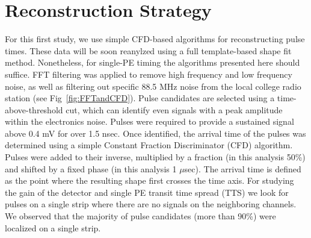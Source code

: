 \documentclass[preprint,12pt]{elsarticle}
\begin{document}


\section{Reconstruction Strategy}
\label{sec:Reco}

\noindent For this first study, we use simple CFD-based algorithms for reconstructing pulse times. These data will be soon reanylzed using a full template-based shape fit method. Nonetheless, for single-PE timing the algorithms presented here should suffice. \noindent FFT filtering was applied to remove high frequency and low frequency noise, as well as filtering out specific 88.5 MHz noise from the local college radio station  (see Fig~\ref{fig:FFTandCFD}). Pulse candidates are selected using a time-above-threshold cut, which can identify even signals with a peak amplitude within the electronics noise. Pulses were required to provide a sustained signal above 0.4 mV for over 1.5 nsec. Once identified, the arrival time of the pulses was determined using a simple Constant Fraction Discriminator (CFD) algorithm. Pulses were added to their inverse, multiplied by a fraction (in this analysis 50\%) and shifted by a fixed phase (in this analysis 1 $\mu$sec). The arrival time is defined as the point where the resulting shape first crosses the time axis. For studying the gain of the detector and single PE transit time spread (TTS) we look for pulses on a single strip where there are no signals on the neighboring channels. We observed that the majority of pulse candidates (more than 90\%) were localized on a single strip.\\

\end{document}
